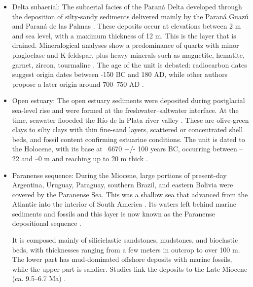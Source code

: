 \begin{itemize}
    \item Delta subaerial: The subaerial facies of the Paraná Delta developed through the deposition of silty-sandy sediments delivered mainly by the Paraná Guazú and Paraná de las Palmas \autocite{joseluiscavallottoEvolucionCambiosAmbientales2005}. These deposits occur at elevations between 2 m and sea level, with a maximum thickness of 12 m. This is the layer that is drained.
    Mineralogical analyses show a predominance of quartz with minor plagioclase and K-feldspar, plus heavy minerals such as magnetite, hematite, garnet, zircon, tourmaline \autocite{rafaelcordiniContribucionConocimientoGeologia1949}. The age of the unit is debated: radiocarbon dates suggest origin dates between -150 BC and 180 AD, while other authors propose a later origin around 700–750 AD \autocite{joseluiscavallottoEvolucionCambiosAmbientales2005}.
    
    \item Open estuary: The open estuary sediments were deposited during postglacial sea-level rise and were formed at the freshwater–saltwater interface. At the time, seawater flooeded the Río de la Plata river valley \autocite{joseluiscavallottoEvolucionCambiosAmbientales2005}.
    These are olive-green clays to silty clays with thin fine-sand layers, scattered or concentrated shell beds, and fossil content confirming estuarine conditions. The unit is dated to the Holocene, with its base at ~6670 +/- 100 years BC, occurring between –22 and –0 m and reaching up to 20 m thick \autocite{vogelGroningenRadiocarbonDates1969}.
    
    \item Paranense sequence: During the Miocene, large portions of present-day Argentina, Uruguay, Paraguay, southern Brazil, and eastern Bolivia were covered by the Paranense Sea. This was a shallow sea that advanced from the Atlantic into the interior of South America . Its waters left behind marine sediments and fossils and this layer is now known as the Paranense depositional sequence \autocite{tineoReconstructingSouthAmerican2024}.
    
    It is composed mainly of siliciclastic sandstones, mudstones, and bioclastic beds, with thicknesses ranging from a few meters in outcrop to over 100 m. The lower part has mud-dominated offshore deposits with marine fossils, while the upper part is sandier. Studies link the deposits to the Late Miocene (ca. 9.5–6.7 Ma) \autocite{tineoReconstructingSouthAmerican2024}.


\end{itemize}
